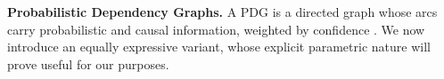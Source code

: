 \textbf{Probabilistic Dependency Graphs.}
A PDG is a
    directed
    graph whose arcs carry
    probabilistic and causal information, weighted by confidence \cite{pdg-aaai}.
We now introduce an equally expressive variant,
    whose explicit parametric nature will prove useful for our purposes.

